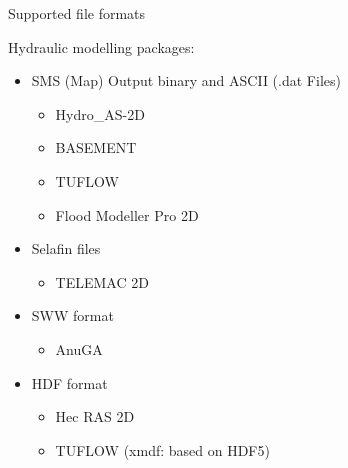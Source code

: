\begin{frame}{Supported file formats}
	\begin{block}{Hydraulic modelling packages:}
		\begin{itemize}
			\item SMS (Map) Output binary and ASCII (.dat Files)
				\begin{itemize}
					\item Hydro\_AS-2D
					\item BASEMENT
					\item TUFLOW
					\item Flood Modeller Pro 2D
				\end{itemize}
			\item Selafin files
					\begin{itemize}
						\item TELEMAC 2D
					\end{itemize}
			\item SWW format
					\begin{itemize}
						\item AnuGA
					\end{itemize}
			\item HDF format
					\begin{itemize}
						\item Hec RAS 2D
						\item TUFLOW (xmdf: based on HDF5)
					\end{itemize}
		\end{itemize}
	
	\end{block}
	
\end{frame}
